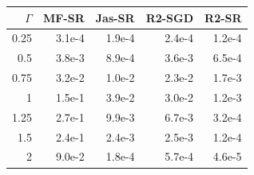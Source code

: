 \begin{tabular}{rrrrr}\toprule
$\Gamma$ & MF-SR & Jas-SR & R2-SGD & R2-SR \\\midrule
0.25 & 3.1e-4 & 1.9e-4 & 2.4e-4 & 1.2e-4 \\
0.5 & 3.8e-3 & 8.9e-4 & 3.6e-3 & 6.5e-4 \\
0.75 & 3.2e-2 & 1.0e-2 & 2.3e-2 & 1.7e-3 \\
1 & 1.5e-1 & 3.9e-2 & 3.0e-2 & 1.2e-3 \\
1.25 & 2.7e-1 & 9.9e-3 & 6.7e-3 & 3.2e-4 \\
1.5 & 2.4e-1 & 2.4e-3 & 2.5e-3 & 1.2e-4 \\
2 & 9.0e-2 & 1.8e-4 & 5.7e-4 & 4.6e-5 \\
\bottomrule\end{tabular}
